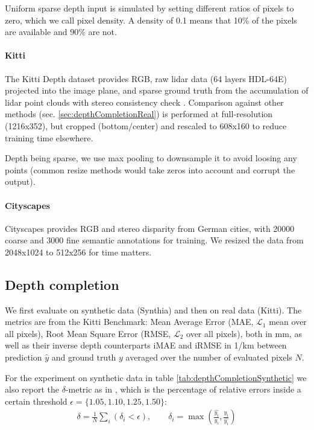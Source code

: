 \documentclass[10pt,twocolumn,letterpaper]{article}
\begin{document}
Uniform sparse depth input is simulated by setting different ratios of pixels to zero, which we call pixel density. A density of 0.1 means that 10\% of the pixels are available and 90\% are not.

\paragraph{Kitti}
The Kitti Depth dataset provides RGB, raw lidar data (64 layers HDL-64E) projected into the image plane, and sparse ground truth from the accumulation of lidar point clouds with stereo consistency check \cite{uhrig2017sparsity}.
Comparison against other methods (sec. \ref{sec:depthCompletionReal}) is performed at full-resolution (1216x352), but cropped (bottom/center) and rescaled to 608x160 to reduce training time elsewhere.


Depth being sparse, we use max pooling to downsample it to avoid loosing any points (common resize methods would take zeros into account and corrupt the output).
\paragraph{Cityscapes}
Cityscapes \cite{Cordts2016Cityscapes} provides RGB and stereo disparity from German cities, with 20000 coarse and 3000 fine semantic annotations for training. We resized the data from 2048x1024 to 512x256 for time matters.

\subsection{Depth completion}
\label{sec:depthCompletion}

We first evaluate on synthetic data (Synthia) and then on real data (Kitti). The metrics are from the Kitti Benchmark: Mean Average Error (MAE, $\mathcal{L}_1$ mean over all pixels),  Root Mean Square Error (RMSE, $\mathcal{L}_2$ over all pixels), both in mm, as well as their inverse depth counterparts iMAE and iRMSE in 1/km between prediction $\hat{y}$ and ground truth $y$ averaged over the number of evaluated pixels $N$. 

For the experiment on synthetic data in table \ref{tab:depthCompletionSynthetic} we also report the $\delta$-metric as in \cite{eigen2014depth}, which is the percentage of relative errors inside a certain threshold $\epsilon = \{1.05, 1.10, 1.25, 1.50\}$:
\begin{align}
\delta =  \frac{1}{N}\sum\limits_{i} (\delta_i < \epsilon), \qquad \delta_i = \max\left(\frac{\hat{y_i}}{y_i}, \frac{y_i}{\hat{y_i}}\right)
\end{align}
\end{document}
